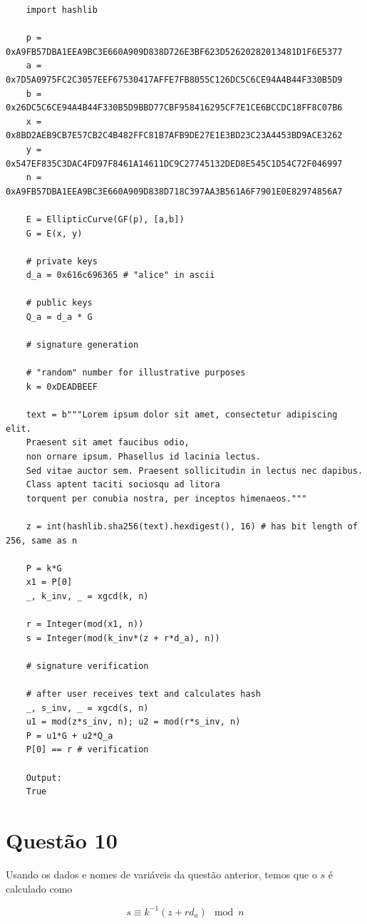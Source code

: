 \documentclass{article}
\begin{document}
\begin{verbatim}
    import hashlib

    p = 0xA9FB57DBA1EEA9BC3E660A909D838D726E3BF623D52620282013481D1F6E5377
    a = 0x7D5A0975FC2C3057EEF67530417AFFE7FB8055C126DC5C6CE94A4B44F330B5D9
    b = 0x26DC5C6CE94A4B44F330B5D9BBD77CBF958416295CF7E1CE6BCCDC18FF8C07B6
    x = 0x8BD2AEB9CB7E57CB2C4B482FFC81B7AFB9DE27E1E3BD23C23A4453BD9ACE3262
    y = 0x547EF835C3DAC4FD97F8461A14611DC9C27745132DED8E545C1D54C72F046997
    n = 0xA9FB57DBA1EEA9BC3E660A909D838D718C397AA3B561A6F7901E0E82974856A7
    
    E = EllipticCurve(GF(p), [a,b])
    G = E(x, y)
    
    # private keys
    d_a = 0x616c696365 # "alice" in ascii
    
    # public keys
    Q_a = d_a * G
    
    # signature generation
    
    # "random" number for illustrative purposes
    k = 0xDEADBEEF
    
    text = b"""Lorem ipsum dolor sit amet, consectetur adipiscing elit.
    Praesent sit amet faucibus odio,
    non ornare ipsum. Phasellus id lacinia lectus.
    Sed vitae auctor sem. Praesent sollicitudin in lectus nec dapibus.
    Class aptent taciti sociosqu ad litora
    torquent per conubia nostra, per inceptos himenaeos."""
    
    z = int(hashlib.sha256(text).hexdigest(), 16) # has bit length of 256, same as n
    
    P = k*G
    x1 = P[0]
    _, k_inv, _ = xgcd(k, n)
    
    r = Integer(mod(x1, n))
    s = Integer(mod(k_inv*(z + r*d_a), n))
    
    # signature verification
    
    # after user receives text and calculates hash
    _, s_inv, _ = xgcd(s, n)
    u1 = mod(z*s_inv, n); u2 = mod(r*s_inv, n)
    P = u1*G + u2*Q_a
    P[0] == r # verification

    Output:
    True
\end{verbatim}

\section*{Questão 10}

Usando os dados e nomes de variáveis da questão anterior, temos que o $s$ é calculado como

\begin{equation*}
    s \equiv k^{-1}(z + r d_a) \mod n
\end{equation*}
\end{document}
